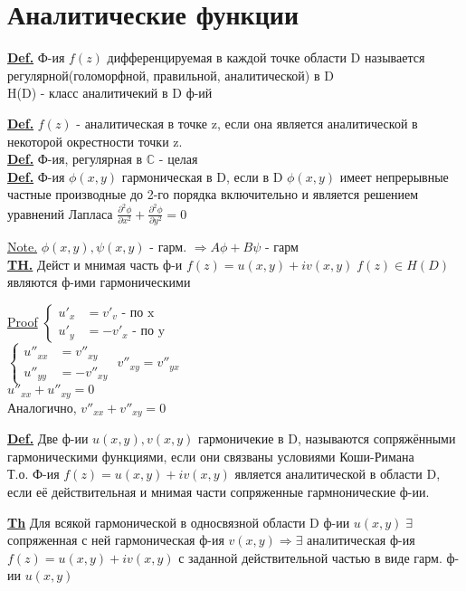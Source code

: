 \documentclass[12pt]{article}
\begin{document}
 \section*{\centering Аналитические функции}

 \textbf{\underline{Def.}} Ф-ия $f(z)$ дифференцируемая в каждой точке области
 D называется регулярной(голоморфной, правильной, аналитической) в D \\
 H(D) - класс аналитичекий в D ф-ий

\textbf{\underline{Def.}} $f(z)$ - аналитическая в точке z, если она является 
аналитической в некоторой окрестности точки z.\\

\textbf{\underline{Def.}}  Ф-ия, регулярная в $\mathbb{C}$ - целая\\

\textbf{\underline{Def.}} Ф-ия $\phi(x,y)$ гармоническая в D, если в D $\phi(x,y)$
имеет непрерывные частные производные до 2-го порядка включительно и является
решением уравнений Лапласа $\frac{\partial^2 \phi}{\partial x^2} + 
\frac{\partial^2 \phi}{\partial y^2} = 0$

\underline{Note.} $\phi(x,y), \psi(x,y) $ - гарм. $\Rightarrow A\phi + B \psi$ -
гарм \\
\textbf{\underline{TH.}} Дейст и мнимая часть ф-и $f(z) = u(x,y) + iv(x,y) \;
f(z) \in H(D)$ являются ф-ими гармоническими

\underline{Proof} $\begin{cases}
    u'_x &= v'_v \text{ - по x } \\
    u'_y &= -v'_x \text{ - по y }
\end{cases}
$ \\
$
\begin{cases}
    u''_{xx} &= v''_{xy}\\
    u''_{yy} &= -v''_{xy} 
\end{cases}
$ \quad $v''_{xy} = v''_{yx} $ \\
$ u''_{xx} + u''_{xy} = 0 $ \\
Аналогично, $v''_{xx} + v''_{xy} = 0 $

\textbf{\underline{Def.}} Две ф-ии $u(x,y), v(x,y)$ гармоничекие в D, называются
сопряжёнными гармоническими функциями, если они связваны условиями Коши-Римана \\

Т.о. Ф-ия $f(z) = u(x,y) + iv(x,y) $ является аналитической в области D, если
её действительная и мнимая части сопряженные гармнонические ф-ии.

\textbf{\underline{Th}} Для всякой гармонической в односвязной области D ф-ии
$u(x,y)\; \exists$ сопряженная с ней гармоническая ф-ия $v(x,y) \Rightarrow
\exists$ аналитическая ф-ия $f(z) = u(x,y) + iv(x,y) $ с заданной действительной
частью в виде гарм. ф-ии $u(x,y)$
\end{document}
